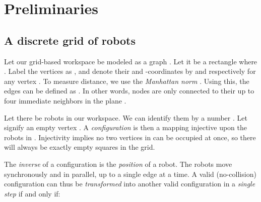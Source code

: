 \section{Preliminaries}

\subsection{A discrete grid of robots}

Let our grid-based workspace be modeled as a graph . 
Let it be a rectangle  where . 
Label the vertices as , and denote their  and  -coordinates by  and  respectively for any vertex .
To measure distance, we use the \emph{Manhattan norm} . Using this, the edges can be defined as . In other words, nodes are only connected to their up to four immediate neighbors in the plane .

Let there be   robots in our workspace. 
We can identify them by a number . 
Let \ilmath{\bot} signify an empty vertex . 
A \emph{configuration} is then a mapping  injective upon the robots in . 
Injectivity implies no two vertices in  can be occupied at once, so there will always be exactly  empty squares in the grid.

The \emph{inverse} of a configuration  \fda{,} is the \emph{position} of a robot.
The robots move synchronously and in parallel, up to a single edge at a time. 
A valid (no-collision) configuration  can thus be \emph{transformed} into another valid configuration  in a \emph{single step} if and only if:

